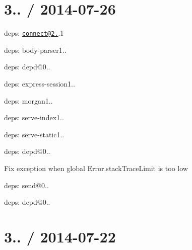 \section*{3.. / 2014-\/07-\/26 }


\begin{DoxyItemize}
\item deps\+: \href{mailto:connect@2.24}{\tt connect@2.}.1
\begin{DoxyItemize}
\item deps\+: body-\/parser1..
\item deps\+: depd@0..
\item deps\+: express-\/session1..
\item deps\+: morgan1..
\item deps\+: serve-\/index1..
\item deps\+: serve-\/static1..
\end{DoxyItemize}
\item deps\+: depd@0..
\begin{DoxyItemize}
\item Fix exception when global {\ttfamily Error.\+stack\+Trace\+Limit} is too low
\end{DoxyItemize}
\item deps\+: send@0..
\begin{DoxyItemize}
\item deps\+: depd@0..
\end{DoxyItemize}
\end{DoxyItemize}

\section*{3.. / 2014-\/07-\/22 }


